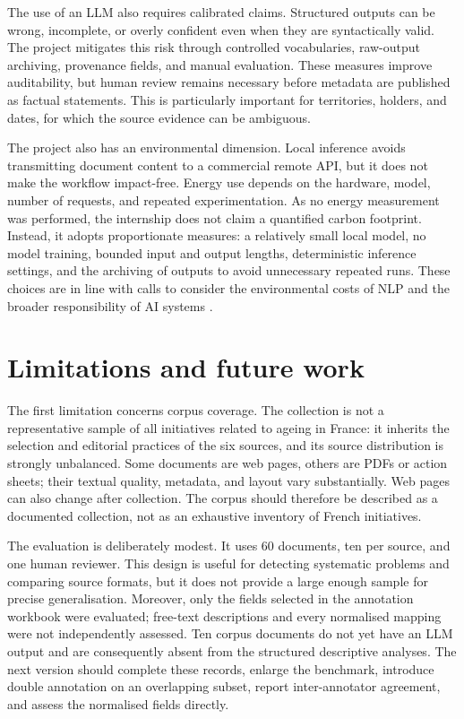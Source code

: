\documentclass[
11pt,
english,
singlespacing,
headsepline,
]{MastersDoctoralThesis}
\begin{document}
The use of an LLM also requires calibrated claims. Structured outputs can be
wrong, incomplete, or overly confident even when they are syntactically valid.
The project mitigates this risk through controlled vocabularies, raw-output
archiving, provenance fields, and manual evaluation. These measures improve
auditability, but human review remains necessary before metadata are published
as factual statements. This is particularly important for territories, holders,
and dates, for which the source evidence can be ambiguous.

The project also has an environmental dimension. Local inference avoids
transmitting document content to a commercial remote API, but it does not make
the workflow impact-free. Energy use depends on the hardware, model, number of
requests, and repeated experimentation. As no energy measurement was performed,
the internship does not claim a quantified carbon footprint. Instead, it adopts
proportionate measures: a relatively small local model, no model training,
bounded input and output lengths, deterministic inference settings, and the
archiving of outputs to avoid unnecessary repeated runs. These choices are in
line with calls to consider the environmental costs of NLP and the broader
responsibility of AI systems \cite{strubell2019energy, unesco2021recommendation}.

\section{Limitations and future work}

The first limitation concerns corpus coverage. The collection is not a
representative sample of all initiatives related to ageing in France: it
inherits the selection and editorial practices of the six sources, and its
source distribution is strongly unbalanced. Some documents are web pages,
others are PDFs or action sheets; their textual quality, metadata, and layout
vary substantially. Web pages can also change after collection. The corpus
should therefore be described as a documented collection, not as an exhaustive
inventory of French initiatives.

The evaluation is deliberately modest. It uses 60 documents, ten per source,
and one human reviewer. This design is useful for detecting systematic
problems and comparing source formats, but it does not provide a large enough
sample for precise generalisation. Moreover, only the fields selected in the
annotation workbook were evaluated; free-text descriptions and every
normalised mapping were not independently assessed. Ten corpus documents do
not yet have an LLM output and are consequently absent from the structured
descriptive analyses. The next version should complete these records, enlarge
the benchmark, introduce double annotation on an overlapping subset, report
inter-annotator agreement, and assess the normalised fields directly.
\end{document}
